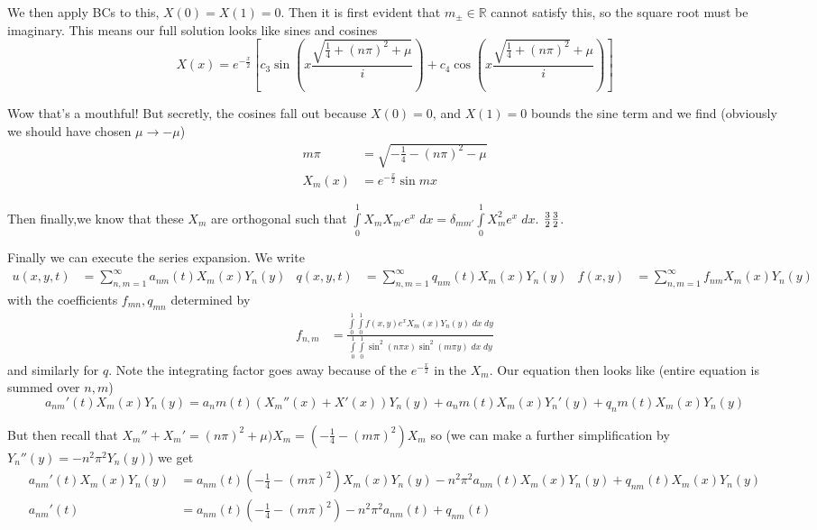 \documentclass[10pt]{article}
\begin{document}
We then apply BCs to this, $X(0) = X(1) = 0$. Then it is first evident that $m_{\pm} \in \mathbb{R}$ cannot satisfy this, so the square root must be imaginary. This means our full solution looks like sines and cosines
\begin{equation}
    X(x) = e^{-\frac{x}{2}}\left[ c_3\sin\left( x\frac{\sqrt{\frac{1}{4} + (n\pi)^2 + \mu}}{i} \right) + c_4\cos\left(x\frac{\sqrt{\frac{1}{4} + (n\pi)^2}+\mu}{i}\right) \right]
\end{equation}

Wow that's a mouthful! But secretly, the cosines fall out because $X(0) = 0$, and $X(1) = 0$ bounds the sine term and we find (obviously we should have chosen $\mu \to -\mu$)
\begin{align}
    m\pi &= \sqrt{-\frac{1}{4} - (n\pi)^2 - \mu}\\
    X_m(x) &= e^{-\frac{x}{2}}\sin mx
\end{align}

Then finally,we know that these $X_m$ are orthogonal such that $\int\limits_{0}^{1}X_mX_{m'}e^x\;dx = \delta_{mm'}\int\limits_{0}^{1}X_m^2e^x\;dx$. ${3 \over 2} \frac{3}{2}$.

Finally we can execute the series expansion. We write
\begin{align}
    u(x,y,t) &= \sum\limits_{n,m=1}^{\infty}a_{nm}(t)X_m(x)Y_n(y) & q(x,y,t) &=\sum\limits_{n,m=1}^{\infty}q_{nm}(t)X_m(x)Y_n(y) & f(x,y) &= \sum\limits_{n,m=1}^{\infty}f_{nm}X_m(x)Y_n(y)
\end{align}
with the coefficients $f_{mn}, q_{mn}$ determined by
\begin{align}
    f_{n,m} &= \frac{\int\limits_{0}^{1}\int\limits_{0}^{1}f(x,y)e^xX_m(x)Y_n(y)\;dx\;dy}{\int\limits_{0}^{1}\int\limits_{0}^{1}\sin^2(n\pi x)\sin^2(m\pi y)\;dx\;dy}
\end{align}
and similarly for $q$. Note the integrating factor goes away because of the $e^{-\frac{x}{2}}$ in the $X_m$. Our equation then looks like (entire equation is summed over $n,m$)
\begin{equation}
    a_{nm}'(t)X_m(x)Y_n(y) = a_nm(t)\left(X_m''(x) + X'(x)\right)Y_n(y) + a_nm(t)X_m(x)Y_n'(y) + q_nm(t)X_m(x)Y_n(y)
\end{equation}

But then recall that $X_m'' + X_m' = (n\pi)^2 + \mu)X_m = \left(-\frac{1}{4} - (m\pi)^2\right)X_m$ so (we can make a further simplification by $Y_n''(y) = -n^2\pi^2 Y_n(y)$) we get
\begin{align}
    a_{nm}'(t)X_m(x)Y_n(y) &= a_{nm}(t)\left(-\frac{1}{4} - (m\pi)^2\right)X_m(x)Y_n(y) - n^2\pi^2 a_{nm}(t)X_m(x)Y_n(y) + q_{nm}(t)X_m(x)Y_n(y)\\
    a_{nm}'(t) &= a_{nm}(t)\left(-\frac{1}{4} - (m\pi)^2\right) - n^2\pi^2 a_{nm}(t) + q_{nm}(t)\\
\end{align}
\end{document}
